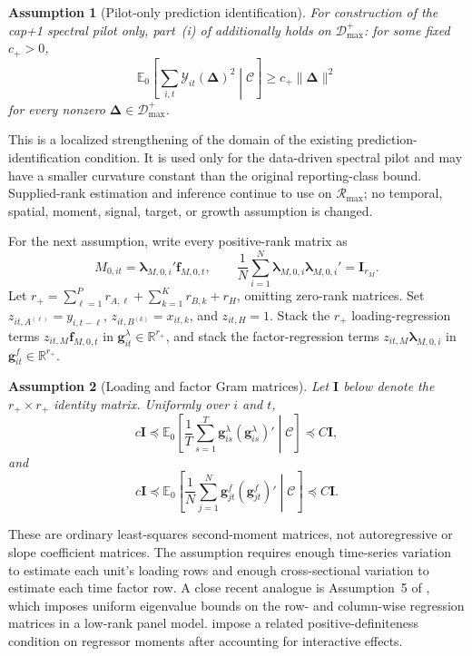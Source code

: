 \documentclass[11pt]{article}
\numberwithin{equation}{section}
\newtheorem{assumption}{Assumption}
\theoremstyle{remark}
\newcommand{\R}{\mathbb R}
\newcommand{\Ezero}{\mathbb E_0}
\newcommand{\bDelta}{\bm\Delta}
\newcommand{\calD}{\mathcal D}
\newcommand{\calR}{\mathcal R}
\begin{document}
\begin{assumption}[Pilot-only prediction identification]
\label{a:pilot_identification}
For construction of the cap+1 spectral pilot only, part~(i) of  additionally holds on $\calD_{\max}^{+}$: for some fixed $c_+>0$,
$$
\Ezero\!\left[
\sum_{i,t}\mathcal Y_{it}(\bDelta)^2
\middle|\mathscr C
\right]
\ge
c_+\|\bDelta\|^2
$$
for every nonzero $\bDelta\in\calD_{\max}^{+}$.
\end{assumption}
This is a localized strengthening of the domain of the existing prediction-identification condition. It is used only for the data-driven spectral pilot and may have a smaller curvature constant than the original reporting-class bound. Supplied-rank estimation and inference continue to use  on $\calR_{\max}$; no temporal, spatial, moment, signal, target, or growth assumption is changed.

For the next assumption, write every positive-rank matrix as
$$
M_{0,it}=\bm\lambda_{M,0,i}'\bm f_{M,0,t},
\qquad
\frac1N\sum_{i=1}^{N}\bm\lambda_{M,0,i}\bm\lambda_{M,0,i}'=\bm I_{r_M}.
$$
Let $r_+=\sum_{\ell=1}^{P}r_{A,\ell}+\sum_{k=1}^{K}r_{B,k}+r_H$, omitting zero-rank matrices. Set $z_{it,A^{(\ell)}}=y_{i,t-\ell}$, $z_{it,B^{(k)}}=x_{it,k}$, and $z_{it,H}=1$. Stack the $r_+$ loading-regression terms $z_{it,M}\bm f_{M,0,t}$ in $\bm g_{it}^{\lambda}\in\R^{r_+}$, and stack the factor-regression terms $z_{it,M}\bm\lambda_{M,0,i}$ in $\bm g_{it}^{f}\in\R^{r_+}$.

\begin{assumption}[Loading and factor Gram matrices]
\label{a:gram}
Let $\bm I$ below denote the $r_+\times r_+$ identity matrix. Uniformly over $i$ and $t$,
$$
c\bm I
\preceq
\Ezero\!\left[
\frac1T\sum_{s=1}^{T}
\bm g_{is}^{\lambda}(\bm g_{is}^{\lambda})'
\middle|\mathscr C
\right]
\preceq
C\bm I,
$$
and
$$
c\bm I
\preceq
\Ezero\!\left[
\frac1N\sum_{j=1}^{N}
\bm g_{jt}^{f}(\bm g_{jt}^{f})'
\middle|\mathscr C
\right]
\preceq
C\bm I.
$$
\end{assumption}
These are ordinary least-squares second-moment matrices, not autoregressive or slope coefficient matrices. The assumption requires enough time-series variation to estimate each unit's loading rows and enough cross-sectional variation to estimate each time factor row. A close recent analogue is Assumption~5 of \citet{wangsu2022}, which imposes uniform eigenvalue bounds on the row- and column-wise regression matrices in a low-rank panel model. \citet{pengetal2025} impose a related positive-definiteness condition on regressor moments after accounting for interactive effects.
\end{document}
